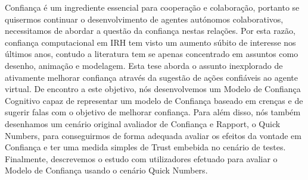 \noindent Confiança é um ingrediente essencial para cooperação e colaboração, portanto se quisermos continuar o desenvolvimento de agentes autónomos colaborativos, necessitamos de abordar a questão da confiança nestas relações. Por esta razão, confiança computacional em \ac{IRH} tem visto um aumento súbito de interesse nos últimos anos, contudo a literatura tem se apenas concentrado em assuntos como desenho, animação e modelagem. Esta tese aborda o assunto inexplorado de ativamente melhorar confiança através da sugestão de ações confiáveis ao agente virtual. De encontro a este objetivo, nós desenvolvemos um Modelo de Confiança Cognitivo capaz de representar um modelo de Confiança baseado em crenças e de sugerir falas com o objetivo de melhorar confiança. Para além disso, nós também desenhamos um cenário original avaliador de Confiança e Rapport, o Quick Numbers, para conseguirmos de forma adequada avaliar os efeitos da vontade em Confiança e ter uma medida simples de Trust embebida no cenário de testes. Finalmente, descrevemos o estudo com utilizadores efetuado para avaliar o Modelo de Confiança usando o cenário Quick Numbers.
